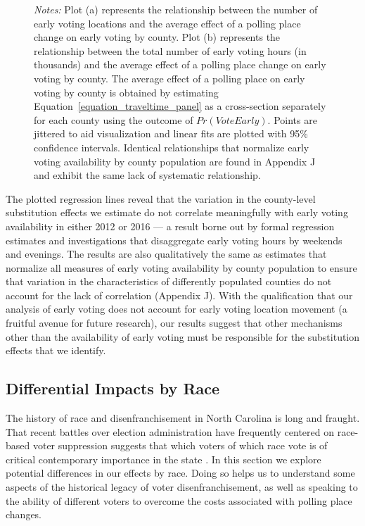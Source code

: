 \documentclass{cup_PSRM}
\begin{document}
\begin{figure}[t!]
\begin{center}
		\label{figure_scatter_earlyvotingavailability}
		\end{center}
	\scriptsize{\emph{Notes:}   Plot (a) represents the relationship between the number of early voting locations and the average effect of a polling place change on early voting by county.  Plot (b) represents the relationship between the total number of early voting hours (in thousands) and the average effect of a polling place change on early voting by county.  The average effect of a polling place on early voting by county is obtained by estimating Equation~\ref{equation_traveltime_panel} as a cross-section separately for each county using the outcome of $Pr(VoteEarly)$.  Points are jittered to aid visualization and linear fits are plotted with 95\% confidence intervals.  Identical relationships that normalize early voting availability by county population are found in Appendix J and exhibit the same lack of systematic relationship.}
\end{figure} \normalsize

The plotted regression lines reveal that the variation in the county-level substitution effects we estimate do not correlate meaningfully with early voting availability in either 2012 or 2016 --- a result borne out  by formal regression estimates and investigations that disaggregate early voting hours by weekends and evenings.  The results are also qualitatively the same as estimates that normalize all measures of early voting availability by county population to ensure that variation in the characteristics of differently populated counties do not account for the lack of correlation (Appendix J). With the qualification that our analysis of early voting does not account for early voting location movement (a fruitful avenue for future research), our results suggest that other mechanisms other than the availability of early voting must be responsible for the substitution effects that we identify.


\subsection{Differential Impacts by Race}\label{subsection_racehetero}

The history of race and disenfranchisement in North Carolina is long and fraught.  That recent battles over election administration have frequently centered on race-based voter suppression suggests that which voters of which race vote is of critical contemporary importance in the state \citep{insightus2016, vasilogambros2018, michaelson2016, roth2015, berman2016}. In this section we explore potential differences in our effects by race.  Doing so helps us to understand some aspects of the historical legacy of voter disenfranchisement, as well as speaking to the ability of different voters to overcome the costs associated with polling place changes.
\end{document}
